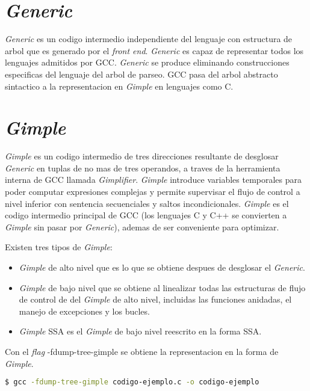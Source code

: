 \section{\emph{Generic}}

\emph{Generic} es un codigo intermedio independiente del lenguaje con estructura de arbol 
que es generado por el \emph{front end}. \emph{Generic} es capaz de representar todos los 
lenguajes admitidos por GCC. \emph{Generic} se produce eliminando construcciones especificas 
del lenguaje del arbol de parseo. 
GCC pasa del arbol abstracto sintactico a la representacion en \emph{Gimple} en lenguajes como C.

\section{\emph{Gimple}}

\emph{Gimple} es un codigo intermedio de tres direcciones resultante de desglosar \emph{Generic} en tuplas 
de no mas de tres operandos, a traves de la herramienta interna de GCC llamada \emph{Gimplifier}. 
\emph{Gimple} introduce variables temporales para poder computar expresiones complejas y permite 
supervisar el flujo de control a nivel inferior con sentencia secuenciales y saltos incondicionales. 
\emph{Gimple} es el codigo intermedio principal de GCC (los lenguajes C y C++ se convierten a \emph{Gimple} 
sin pasar por \emph{Generic}), ademas de ser conveniente para optimizar. 

Existen tres tipos de \emph{Gimple}:

\begin{itemize}
    \item \emph{Gimple} de alto nivel que es lo que se obtiene despues de desglosar el \emph{Generic}.
    \item \emph{Gimple} de bajo nivel que se obtiene al linealizar todas las estructuras de flujo de control de 
            del \emph{Gimple} de alto nivel, incluidas las funciones anidadas, el manejo de excepciones y los bucles.
    \item \emph{Gimple} SSA es el \emph{Gimple} de bajo nivel reescrito en la forma SSA.
\end{itemize}

Con el \emph{flag} -fdump-tree-gimple se obtiene la representacion en la forma de \emph{Gimple}.

\begin{lstlisting}[label=comandoC, caption= Comando de compilación del archivo codigo-ejemplo.c \cite{repositorio} para GCC., language=bash]
    $ gcc -fdump-tree-gimple codigo-ejemplo.c -o codigo-ejemplo  \end{lstlisting}

